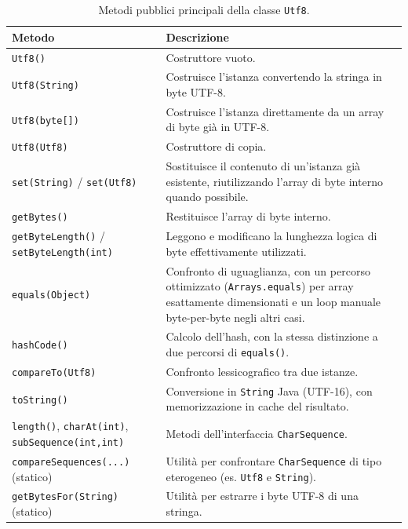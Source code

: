 \begin{table}[h]
\centering
\footnotesize
\begin{tabular}{@{}p{3.2cm}p{9.3cm}@{}}
\toprule
\textbf{Metodo} & \textbf{Descrizione} \\
\midrule
\texttt{Utf8()} & Costruttore vuoto. \\
\addlinespace
\texttt{Utf8(String)} & Costruisce l'istanza convertendo la stringa in byte UTF-8. \\
\addlinespace
\texttt{Utf8(byte[])} & Costruisce l'istanza direttamente da un array di byte già in UTF-8. \\
\addlinespace
\texttt{Utf8(Utf8)} & Costruttore di copia. \\
\addlinespace
\texttt{set(String)} / \texttt{set(Utf8)} & Sostituisce il contenuto di un'istanza già esistente, riutilizzando l'array di byte interno quando possibile. \\
\addlinespace
\texttt{getBytes()} & Restituisce l'array di byte interno. \\
\addlinespace
\texttt{getByteLength()} / \texttt{setByteLength(int)} & Leggono e modificano la lunghezza logica di byte effettivamente utilizzati. \\
\addlinespace
\texttt{equals(Object)} & Confronto di uguaglianza, con un percorso ottimizzato (\texttt{Arrays.equals}) per array esattamente dimensionati e un loop manuale byte-per-byte negli altri casi. \\
\addlinespace
\texttt{hashCode()} & Calcolo dell'hash, con la stessa distinzione a due percorsi di \texttt{equals()}. \\
\addlinespace
\texttt{compareTo(Utf8)} & Confronto lessicografico tra due istanze. \\
\addlinespace
\texttt{toString()} & Conversione in \texttt{String} Java (UTF-16), con memorizzazione in cache del risultato. \\
\addlinespace
\texttt{length()}, \texttt{charAt(int)}, \texttt{subSequence(int,int)} & Metodi dell'interfaccia \texttt{CharSequence}. \\
\addlinespace
\texttt{compareSequences(...)} (statico) & Utilità per confrontare \texttt{CharSequence} di tipo eterogeneo (es. \texttt{Utf8} e \texttt{String}). \\
\addlinespace
\texttt{getBytesFor(String)} (statico) & Utilità per estrarre i byte UTF-8 di una stringa. \\
\bottomrule
\end{tabular}
\caption{Metodi pubblici principali della classe \texttt{Utf8}.}
\label{tab:utf8-metodi}
\end{table}

